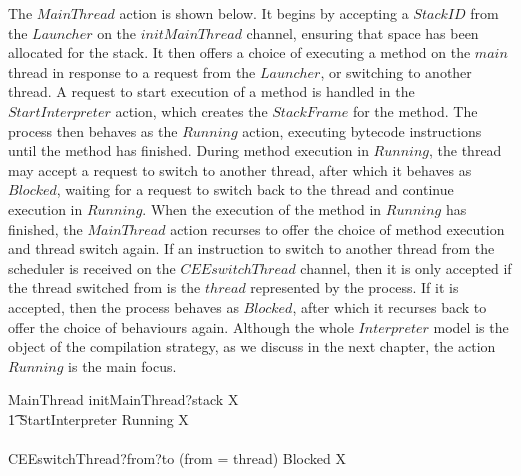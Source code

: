 The $MainThread$ action is shown below.
It begins by accepting a $StackID$ from the $Launcher$ on the
$initMainThread$ channel, ensuring that space has been allocated for
the stack.
It then offers a choice of executing a method on the $main$ thread in
response to a request from the $Launcher$, or switching to another
thread.
A request to start execution of a method is handled in the
$StartInterpreter$ action, which creates the $StackFrame$ for the
method.
The process then behaves as the $Running$ action, executing bytecode
instructions until the method has finished.
During method execution in $Running$, the thread may accept a request
to switch to another thread, after which it behaves as $Blocked$,
waiting for a request to switch back to the thread and continue
execution in $Running$.
When the execution of the method in $Running$ has finished, the
$MainThread$ action recurses to offer the choice of method execution
and thread switch again.
If an instruction to switch to another thread from the scheduler is
received on the $CEEswitchThread$ channel, then it is only accepted if
the thread switched from is the $thread$ represented by the process.
If it is accepted, then the process behaves as $Blocked$, after which
it recurses back to offer the choice of behaviours again.
Although the whole $Interpreter$ model is the object of the
compilation strategy, as we discuss in the next chapter, the action
$Running$ is the main focus.
\begin{circusaction}
  MainThread \circdef initMainThread?stack \then \circmu X \circspot \\
  \t1 \circblockbegin
  StartInterpreter \circseq Running \circseq X \\
  {} \extchoice {} \\
  CEEswitchThread?from?to \prefixcolon (from = thread) \then Blocked \circseq X
  \circblockend
\end{circusaction}

